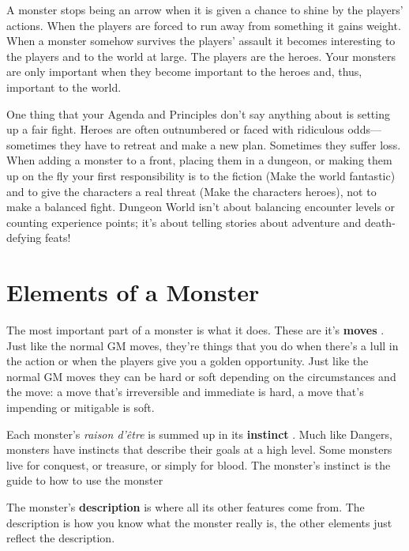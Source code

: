  

A monster stops being an arrow when it is given a chance to shine by the players' actions. When the players are forced to run away from something it gains weight. When a monster somehow survives the players' assault it becomes interesting to the players and to the world at large. The players are the heroes. Your monsters are only important when they become important to the heroes and, thus, important to the world.

 

One thing that your Agenda and Principles don't say anything about is setting up a fair fight. Heroes are often outnumbered or faced with ridiculous odds—sometimes they have to retreat and make a new plan. Sometimes they suffer loss. When adding a monster to a front, placing them in a dungeon, or making them up on the fly your first responsibility is to the fiction (Make the world fantastic) and to give the characters a real threat (Make the characters heroes), not to make a balanced fight. Dungeon World isn't about balancing encounter levels or counting experience points; it's about telling stories about adventure and death-defying feats!

 
\section{Elements of a Monster}    
 

The most important part of a monster is what it does. These are it's {\bf moves} . Just like the normal GM moves, they're things that you do when there's a lull in the action or when the players give you a golden opportunity. Just like the normal GM moves they can be hard or soft depending on the circumstances and the move: a move that's irreversible and immediate is hard, a move that's impending or mitigable is soft.

 

Each monster's {\em raison d'être}  is summed up in its {\bf instinct} . Much like Dangers, monsters have instincts that describe their goals at a high level. Some monsters live for conquest, or treasure, or simply for blood. The monster's instinct is the guide to how to use the monster

 

The monster's {\bf description}  is where all its other features come from. The description is how you know what the monster really is, the other elements just reflect the description.

